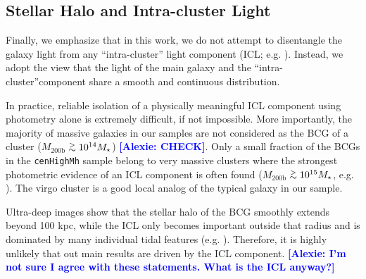 \documentclass[a4paper,fleqn,usenatbib]{mnras}
\def\simgt{\lower.5ex\hbox{$\; \buildrel > \over {\sim} \;$}}
\def\rbcg{\texttt{cenHighMh}}
\def\mhalo{{$M_{\mathrm{200b}}$}}
\newcommand{\alexie}[1]{\textcolor{blue}{\textbf{[Alexie: #1]}}}
\begin{document}


\subsection{Stellar Halo and Intra-cluster Light}     
      
    Finally, we emphasize that in this work, we do not attempt  to  disentangle the galaxy light from any ``intra-cluster'' light component (ICL; e.g. 
    \citealt{Carlberg1997, Lin2004, Gonzalez2005, Mihos2005}). Instead, we adopt the view that the light of the main galaxy and the 
    ``intra-cluster''component share a smooth and continuous distribution. 
    
    In practice, reliable isolation of a physically meaningful ICL component using 
    photometry alone is extremely difficult, if not impossible. 
    More importantly, the majority of massive galaxies in our samples are not considered 
    as the BCG of a cluster (\mhalo{}$\simgt 10^{14}M_{\star}$) \alexie{CHECK}. 
    Only a small fraction of the BCGs in the \rbcg{} sample belong to very 
    massive clusters where the strongest photometric evidence of an ICL component is 
    often found (\mhalo{}$\simgt 10^{15}M_{\star}$, e.g. \citealt{Presotto2014, 
    Burke2015}). The virgo cluster is a good  local analog of the typical galaxy in our sample. 
    
 
    Ultra-deep images show that the stellar halo of the BCG smoothly extends beyond 
    100 kpc, while the ICL only becomes important outside that radius and is dominated 
    by many individual tidal features (e.g. \citealt{Mihos2016}).
    Therefore, it is highly unlikely that out main results are driven by the ICL component. \alexie{I'm not sure I agree with these statements. What is the ICL anyway?}
\end{document}
